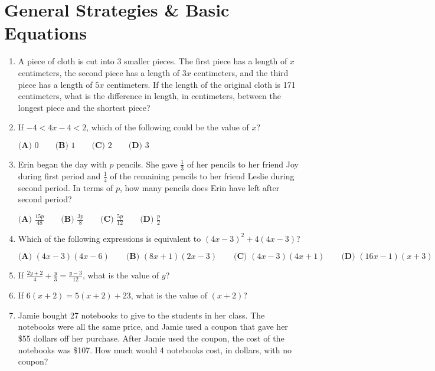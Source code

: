 \documentclass[../satmath.tex]{subfiles}
\begin{document}
\chapter{General Strategies \& Basic Equations}
\begin{enumerate}[label=\bfseries\arabic*.]
\item %
A piece of cloth is cut into 3 smaller pieces. The first piece has a length of $x$ centimeters, the second piece has a length of $3x$
centimeters, and the third piece has a length of $5x$ centimeters. If the length of the original cloth is 171 centimeters, what is the difference 
in length, in centimeters, between the longest piece and the shortest piece?

\item %
If $-4<4x-4<2$, which of the following could be the value of $x$?

$\textbf{(A) } 0 \qquad \textbf{(B) } 1 \qquad \textbf{(C) } 2 \qquad \textbf{(D) } 3$

\item %
Erin began the day with $p$ pencils. She gave $\frac{1}{3}$ of her pencils to her friend Joy during first period and $\frac{1}{4}$ of the remaining 
pencils to her friend Leslie during second period. In terms of $p$, how many pencils does Erin have left after second period?

$\textbf{(A) } \frac{15p}{48} \qquad \textbf{(B) } \frac{3p}{8} \qquad \textbf{(C) } \frac{5p}{12} \qquad \textbf{(D) } \frac{p}{2}$

\item %
Which of the following expressions is equivalent to $(4x-3)^2+4(4x-3)$?

$\textbf{(A) } (4x-3)(4x-6) \qquad \textbf{(B) } (8x+1)(2x-3) \qquad \textbf{(C) } (4x-3)(4x+1) \qquad \textbf{(D) } (16x-1)(x+3)$

\item %
If $\frac{2y+2}{4}+\frac{y}{3}=\frac{y-3}{12}$, what is the value of $y$?

\item %
If $6(x+2)=5(x+2)+23$, what is the value of $(x+2)$?

\item %
Jamie bought 27 notebooks to give to the students in her class. The notebooks were all the same price, and Jamie used a coupon that gave her 
\$55 dollars off her purchase. After Jamie used the coupon, the cost of the notebooks was \$107. How much would 4 notebooks cost, in dollars, with no coupon?


\end{enumerate}
\end{document}
